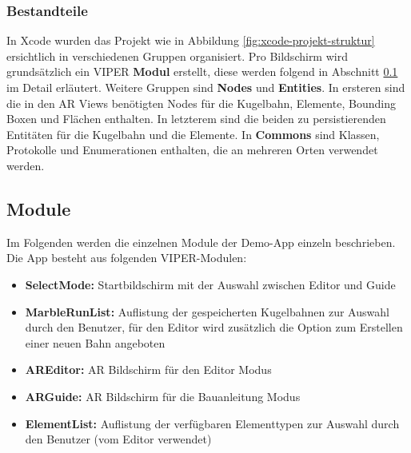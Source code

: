 

\subsubsection{Bestandteile} %


In Xcode wurden das Projekt wie in Abbildung \ref{fig:xcode-projekt-struktur} ersichtlich in verschiedenen Gruppen organisiert.
Pro Bildschirm wird grundsätzlich ein VIPER \textbf{Modul} erstellt, diese werden folgend in Abschnitt \ref{sub:umsetzung-module} im Detail erläutert.
Weitere Gruppen sind \textbf{Nodes} und \textbf{Entities}.
In ersteren sind die in den AR Views benötigten Nodes für die Kugelbahn, Elemente, Bounding Boxen und Flächen enthalten.
In letzterem sind die beiden zu persistierenden Entitäten für die Kugelbahn und die Elemente.
In \textbf{Commons} sind Klassen, Protokolle und Enumerationen enthalten, die an mehreren Orten verwendet werden.

\subsection{Module}\label{sub:umsetzung-module}

Im Folgenden werden die einzelnen Module der Demo-App einzeln beschrieben.
Die App besteht aus folgenden VIPER-Modulen:

\begin{itemize}
	\item \textbf{SelectMode:} Startbildschirm mit der Auswahl zwischen Editor und Guide
	\item \textbf{MarbleRunList:} Auflistung der gespeicherten Kugelbahnen zur Auswahl durch den Benutzer, für den Editor wird zusätzlich die Option zum Erstellen einer neuen Bahn angeboten
	\item \textbf{AREditor:} AR Bildschirm für den Editor Modus
	\item \textbf{ARGuide:} AR Bildschirm für die Bauanleitung Modus
	\item \textbf{ElementList:} Auflistung der verfügbaren Elementtypen zur Auswahl durch den Benutzer (vom Editor verwendet)
\end{itemize}

